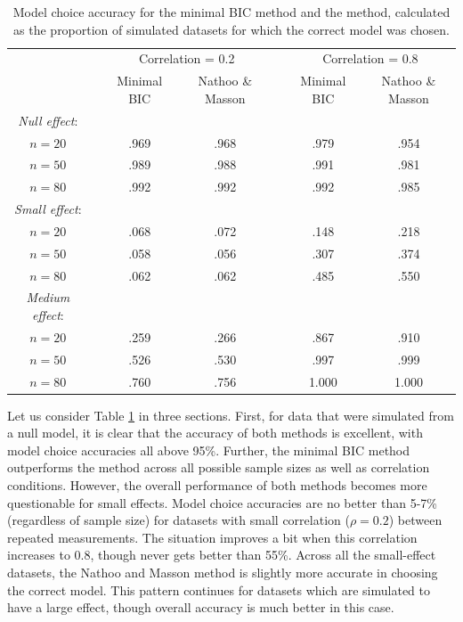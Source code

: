 \documentclass[12pt,twoside,a4paper]{article}
\begin{document}
\begin{table}
  \centering \small
  \begin{tabular}{ccccccc}
    & & \multicolumn{2}{c}{Correlation = 0.2} & & \multicolumn{2}{c}{Correlation = 0.8}\\
    & & Minimal BIC & Nathoo \& Masson & & Minimal BIC & Nathoo \& Masson\\
    \hline
    {\it Null effect}:\\
    $n=20$ & & .969 & .968 & & .979 & .954\\
    $n=50$ & & .989 & .988 & & .991 & .981\\
    $n=80$ & & .992 & .992 & & .992 & .985\\[2mm]

    {\it Small effect}:\\
    $n=20$ & & .068 & .072 & & .148 & .218\\
    $n=50$ & & .058 & .056 & & .307 & .374\\
    $n=80$ & & .062 & .062 & & .485 & .550\\[2mm]

    {\it Medium effect}:\\
    $n=20$ & & .259 & .266 & & .867 & .910\\
    $n=50$ & & .526 & .530 & & .997 & .999\\
    $n=80$ & & .760 & .756 & & 1.000 & 1.000\\
    \hline
    
  \end{tabular}
  \caption{Model choice accuracy for the minimal BIC method and the \citet{nathoo2016} method, calculated as the proportion of simulated datasets for which the correct model was chosen.}
  \label{tab:acc}
\end{table}

Let us consider Table \ref{tab:acc} in three sections. First, for data that were simulated from a null model, it is clear that the accuracy of both methods is excellent, with model choice accuracies all above 95\%. Further, the minimal BIC method outperforms the \citet{nathoo2016} method across all possible sample sizes as well as correlation conditions. However, the overall performance of both methods becomes more questionable for small effects. Model choice accuracies are no better than 5-7\% (regardless of sample size) for datasets with small correlation ($\rho=0.2$) between repeated measurements. The situation improves a bit when this correlation increases to 0.8, though never gets better than 55\%. Across all the small-effect datasets, the Nathoo and Masson method is slightly more accurate in choosing the correct model. This pattern continues for datasets which are simulated to have a large effect, though overall accuracy is much better in this case.
\end{document}
